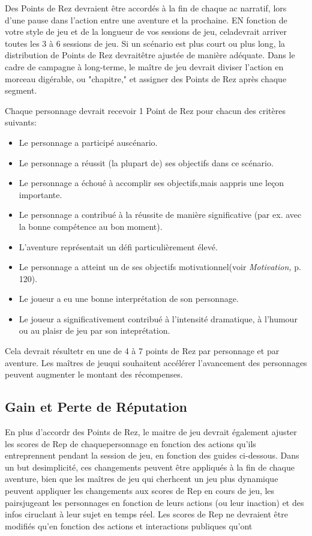 Des Points de Rez devraient être accordés à la fin de chaque ac narratif, lors d'une pause dans l'action entre une aventure et la prochaine. EN fonction de votre style de jeu et de la longueur de vos sessions de jeu, celadevrait arriver toutes les 3 à 6 sessions de jeu. Si un scénario est plus court ou plus long, la distribution de Points de Rez devraitêtre ajustée de manière adéquate. Dans le cadre de campagne à long-terme, le maître de jeu devrait diviser l'action en morceau digérable, ou "chapitre," et assigner des Points de Rez après chaque segment.  

Chaque personnage devrait recevoir 1 Point de Rez pour chacun des critères suivants:
\begin{itemize}
   \item Le personnage a participé auscénario.
   \item Le personnage a réussit (la plupart de) ses objectifs dans ce scénario.
   \item Le personnage a échoué à accomplir ses objectifs,mais aappris une leçon importante.
   \item Le personnage a contribué à la réussite de manière significative (par ex. avec la bonne compétence au bon moment).
   \item L'aventure représentait un défi particulièrement élevé.
   \item Le personnage a atteint un de ses objectifs motivationnel(voir \textit{Motivation,} p. 120).
   \item Le joueur a eu une bonne interprétation de son personnage.
   \item Le joueur a significativement contribué à l'intensité dramatique, à l'humour ou au plaisr de jeu par son inteprétation.
\end{itemize} 

Cela devrait résultetr en une de 4 à 7 points de Rez par personnage et par aventure. Les maîtres de jeuqui souhaitent accélérer l'avancement des personnages peuvent augmenter le montant des récompenses. 

\subsection{Gain et Perte de Réputation} 

En plus d'accordr des Points de Rez, le maitre de jeu devrait également ajuster les scores de Rep de chaquepersonnage en fonction des actions qu'ils entreprennent pendant la session de jeu, en fonction des guides ci-dessous. Dans un but desimplicité, ces changements peuvent être appliqués à la fin de chaque aventure, bien que les maîtres de jeu qui cherhcent un jeu plus dynamique peuvent appliquer les changements aux scores de Rep en cours de jeu, les pairsjugeant les personnages en fonction de leurs actions (ou leur inaction) et des infos ciruclant à leur sujet en temps réel. Les scores de Rep ne devraient être modifiés qu'en fonction des actions et interactions publiques qu'ont 

